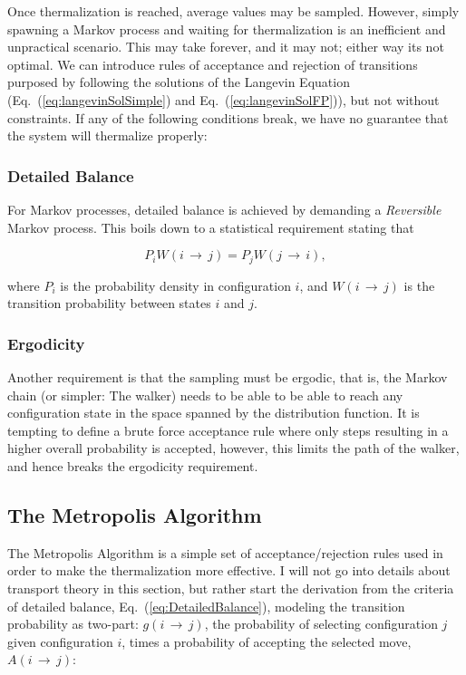 Once thermalization is reached, average values may be sampled. However, simply spawning a Markov process and waiting for thermalization is an inefficient and unpractical scenario. This may take forever, and it may not; either way its not optimal. We can introduce rules of acceptance and rejection of transitions purposed by following the solutions of the Langevin Equation (Eq.~(\ref{eq:langevinSolSimple}) and Eq.~(\ref{eq:langevinSolFP})), but not without constraints. If any of the following conditions break, we have no guarantee that the system will thermalize properly:

\subsubsection{Detailed Balance} 

For Markov processes, detailed balance is achieved by demanding a \textit{Reversible} Markov process. This boils down to a statistical requirement stating that 

\begin{equation}
 \label{eq:DetailedBalance}
 P_iW(i\,\rightarrow\,j) = P_jW(j\,\rightarrow\,i),
\end{equation}

where $P_i$ is the probability density in configuration $i$, and $W(i\,\rightarrow\,j)$ is the transition probability between states $i$ and $j$. 

\subsubsection{Ergodicity}

Another requirement is that the sampling must be ergodic, that is, the Markov chain (or simpler: The walker) needs to be able to be able to reach any configuration state in the space spanned by the distribution function. It is tempting to define a brute force acceptance rule where only steps resulting in a higher overall probability is accepted, however, this limits the path of the walker, and hence breaks the ergodicity requirement.

\subsection{The Metropolis Algorithm}

The Metropolis Algorithm is a simple set of acceptance/rejection rules used in order to make the thermalization more effective. I will not go into details about transport theory in this section, but rather start the derivation from the criteria of detailed balance, Eq.~(\ref{eq:DetailedBalance}), modeling the transition probability as two-part: $g(i\,\rightarrow\,j)$, the probability of selecting configuration $j$ given configuration $i$, times a probability of accepting the selected move, $A(i\,\rightarrow\,j)$:

